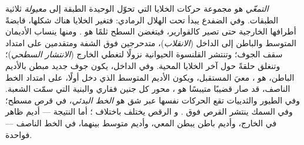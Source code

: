 \begin{proposition}[التمعّي]\label{prop:b2:vertebrate-development:gastrulation}
\emph{التمعّي} هو مجموعة حركات الخلايا التي تحوّل
 الوحيدة الطبقة إلى \emph{معيولة} ثلاثية الطبقات. وفي
الضفدع يبدأ تحت الهلال الرمادي: فتغير الخلايا هناك شكلها،
قابضةً أطرافها الخارجية حتى تصير كالقوارير، فيتغضن السطح
ثلمًا هو \emph{}. ومنها ينساب الأديمان المتوسط
والباطن إلى الداخل (\emph{الانقلاب})، متدحرجين فوق الشفة
ومتقدمين على امتداد سقف الجوف؛ وتنتشر القلنسوة الحيوانية
نزولًا لتغطي الخارج (\emph{الانتشار السطحي})؛ وتنغلق 
حلقةً حول آخر الخلايا المحية. وفي الداخل، يكون جوف جديد
مبطن بالأديم الباطن، هو \emph{}، معيَ المستقبل،
ويكون الأديم المتوسط الذي دخل أولًا، على امتداد الخط الناصف، قد صار
قضيبًا متيبسًا هو \emph{}، محور كل جنين فقاري
والبنية التي سمّت الشعبة. وفي الطيور والثدييات تقع
الحركات نفسها عبر شق هو \emph{الخط البدئي}،
في قرص مسطح؛ وفي السمك ينتشر القرص فوق . و
الرقص يختلف باختلاف ؛ أما النتيجة --- أديم ظاهر في الخارج،
وأديم باطن يبطن المعي، وأديم متوسط بينهما،  في الخط الناصف
--- فواحدة.
\end{proposition}

